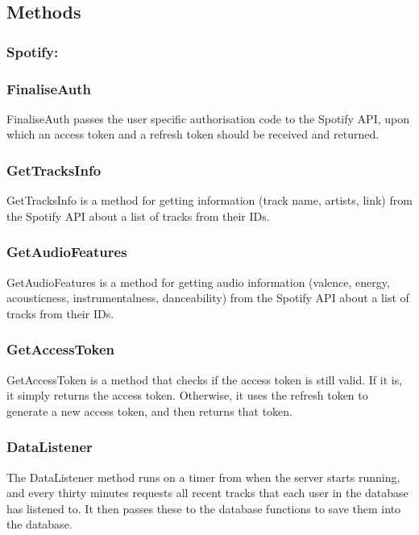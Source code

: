 \documentclass[10pt, notitlepage]{report}
\begin{document}
\subsection{Methods}

\subsubsection{Spotify:}

\hrulefill

\subsubsection{FinaliseAuth}
FinaliseAuth passes the user specific authorisation code to the Spotify API, upon which an access token and a refresh token should be received and returned.

\subsubsection{GetTracksInfo}
GetTracksInfo is a method for getting information (track name, artists, link) from the Spotify API about a list of tracks from their IDs.

\subsubsection{GetAudioFeatures}
GetAudioFeatures is a method for getting audio information (valence, energy, acousticness, instrumentalness, danceability) from the Spotify API about a list of tracks from their IDs.

\subsubsection{GetAccessToken}
GetAccessToken is a method that checks if the access token is still valid. If it is, it simply returns the access token. Otherwise, it uses the refresh token to generate a new access token, and then returns that token.

\subsubsection{DataListener}
The DataListener method runs on a timer from when the server starts running, and every thirty minutes requests all recent tracks that each user in the database has listened to. It then passes these to the database functions to save them into the database.
\end{document}

